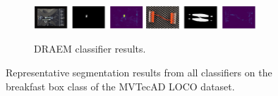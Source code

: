 \begin{figure}[H]
\begin{subfigure}[b]{\textwidth}
    \end{subfigure}
    \begin{subfigure}[b]{\textwidth}
        \centering
        \includegraphics[width=0.45\textwidth]{figures/locoallapproaches/DRAEM/DRAEM_SB.png}
        \includegraphics[width=0.45\textwidth]{figures/locoallapproaches/DRAEM/DRAEM_SC.png}
        \caption{DRAEM \cite{Zavrtanik_2021DRAEM} classifier results.}

    \end{subfigure}
    
    \caption{Representative segmentation results from all classifiers on the breakfast box class of the MVTecAD LOCO \cite{LOCODentsAndScratchesBergmann2022} dataset.}
    \label{fig:appendixensembleasdasdasdaad}
\end{figure}